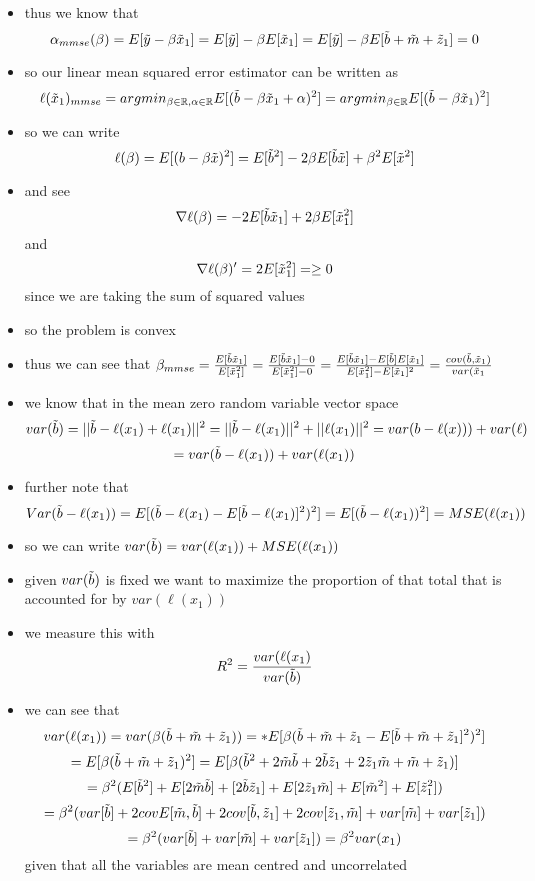 \documentclass[12pt,twoside]{article}
\begin{document}
\begin{enumerate}
\begin{enumerate}
\begin{itemize}
\begin{itemize}
    \end{itemize}
    \item thus we know that $$\alpha_{mmse}(\beta)=E[\Tilde{y}- \beta \Tilde{x}_1]=E[\Tilde{y}]- \beta E[\Tilde{x}_1]=E[\Tilde{y}]- \beta E[\Tilde{b}+\Tilde{m}+\Tilde{z}_1]=0$$
    \item so our linear mean squared error estimator can be written as $$\ell(\Tilde{x}_1)_{mmse}=argmin_{\beta \in \mathbb{R} , \alpha \in \mathbb{R}}E[( \Tilde{b}-\beta \Tilde{x}_1 + \alpha)^2]=argmin_{\beta \in \mathbb{R}}E[ (\Tilde{b}-\beta \Tilde{x}_1)^2]$$
    \item so we can write $$\ell(\beta)=E[(b-\beta \Tilde{x})^2]=E[\Tilde{b}^2]-2\beta E[\Tilde{b}\Tilde{x}] + \beta^2E[\Tilde{x}^2]$$
    \item and see  $$\nabla \ell(\beta) =-2E[\Tilde{b}\Tilde{x}_1]+2\beta E[\Tilde{x}_1^2] $$
    and $$\nabla \ell(\beta)' =2E[\Tilde{x}_1^2]=\geq 0 $$ since we are taking the sum of squared values 
    \item so the problem is convex
    \item thus we can see that $\beta_{mmse}=\frac{E[\Tilde{b}\Tilde{x}_1]}{E[\Tilde{x}_1^2]}=\frac{E[\Tilde{b}\Tilde{x}_1]-0}{E[\Tilde{x}_1^2]-0}=\frac{E[\Tilde{b}\Tilde{x}_1]-E[\Tilde{b}]E[\Tilde{x}_1]}{E[\Tilde{x}_1^2]-E[\Tilde{x}_1]^2}=\frac{cov(\Tilde{b}, \Tilde{x}_1)}{var(\Tilde{x}_1}$
    \item we know that in the mean zero random variable vector space $$var(\Tilde{b})=||\Tilde{b}-\ell(x_1)+\ell(x_1)||^2=||\Tilde{b}-\ell(x_1)||^2+||\ell(x_1)||^2=var(b-\ell(x)))+var(\ell)$$ $$=var(\Tilde{b}-\ell(x_1))+var(\ell(x_1))$$
    \item further note that $$Var(\Tilde{b}-\ell(x_1))=E[(\Tilde{b}-\ell(x_1) - E[\Tilde{b}-\ell(x_1)]^2)^2]=E[(\Tilde{b}-\ell(x_1))^2]=MSE(\ell(x_1))$$
    \item so we can write $var(\Tilde{b})=var(\ell(x_1))+MSE(\ell(x_1))$
    \item given $var(\Tilde{b})$ is fixed  we want to maximize the proportion of that total that is accounted for by $var(\ell(x_1))$
    \item we measure this with $$R^2=\frac{var(\ell(x_1)}{var(\Tilde{b})}$$
    \item we can see that $$var(\ell(x_1))=var(\beta (\Tilde{b}+\Tilde{m}+\Tilde{z}_1))= *E[\beta (\Tilde{b}+\Tilde{m}+\Tilde{z}_1-E[\Tilde{b}+\Tilde{m}+\Tilde{z}_1]^2)^2]$$
    $$=E[\beta (\Tilde{b}+\Tilde{m}+\Tilde{z}_1)^2]=E[\beta(\Tilde{b}^2 + 2\Tilde{m}\Tilde{b}+2\Tilde{b}\Tilde{z}_1+2\Tilde{z}_1\Tilde{m}+\Tilde{m}+\Tilde{z}_1)]$$ $$=\beta^2(E[\Tilde{b}^2] + E[2\Tilde{m}\Tilde{b}]+[2\Tilde{b}\Tilde{z}_1]+E[2\Tilde{z}_1\Tilde{m}]+E[\Tilde{m}^2]+E[\Tilde{z}_1^2]) $$ $$=\beta^2 (var[\Tilde{b}] + 2covE[\Tilde{m},\Tilde{b}]+2cov[\Tilde{b},\Tilde{z}_1]+2cov[\Tilde{z}_1,\Tilde{m}]+var[\Tilde{m}]+var[\Tilde{z}_1]) $$ $$ =\beta^2 (var[\Tilde{b}] + var[\Tilde{m}]+var[\Tilde{z}_1])=\beta^2 var(x_1)$$ given that all the variables are mean centred and uncorrelated

\end{itemize}
\end{enumerate}
\end{enumerate}
\end{document}
